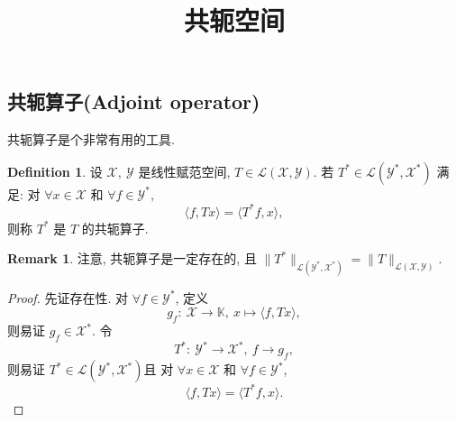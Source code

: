 \documentclass[a4paper,11pt]{article}
\title{共轭空间}
\theoremstyle{definition}
\newtheorem{remark}[theorem]{Remark}
\newtheorem{definition}[theorem]{Definition}
\begin{document}
\begin{CJK*}{UTF8}{gbsn}

\maketitle

\section{共轭算子(Adjoint operator)}

共轭算子是个非常有用的工具.

\begin{definition}
    设 $ \mathcal{X},\ \mathcal{Y} $ 是线性赋范空间, $ T \in \mathscr{L}(\mathcal{X}, \mathcal{Y}) $.
    若 $ T^* \in \mathscr{L}(\mathcal{Y}^*, \mathcal{X}^*) $ 满足: 
    对 $ \forall x \in \mathcal{X} $ 和 $ \forall f \in \mathcal{Y}^* $,
    $$
        \langle f, Tx \rangle = \langle T^* f, x \rangle,
    $$
    则称 $ T^* $ 是 $ T $ 的共轭算子.
\end{definition}

\begin{remark}
    注意, 共轭算子是一定存在的, 且 
    $ \| T^* \|_{\mathscr{L}(\mathcal{Y}^*, \mathcal{X}^*)} = \| T \|_{\mathscr{L}(\mathcal{X}, \mathcal{Y})} $.
\end{remark}

\begin{proof}
    先证存在性. 对 $ \forall f \in \mathcal{Y}^* $, 定义
    $$
        g_f :\ \mathcal{X} \to \mathbb{K},\ x \mapsto \langle f, Tx \rangle,
    $$
    则易证 $ g_f \in \mathcal{X}^* $. 令
    $$
        T^* :\ \mathcal{Y}^* \to \mathcal{X}^*,\ f \to g_f,
    $$
    则易证 $ T^* \in \mathscr{L}(\mathcal{Y}^*, \mathcal{X}^*) $且
    对 $ \forall x \in \mathcal{X} $ 和 $ \forall f \in \mathcal{Y}^* $,
    $$
        \langle f, Tx \rangle = \langle T^* f, x \rangle.
    $$
    

\end{proof}
\end{CJK*}
\end{document}
